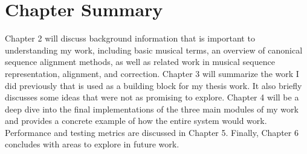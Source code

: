 \section{Chapter Summary}
Chapter 2 will discuss background information that is important to understanding my work, including basic musical terms, an overview of canonical sequence alignment methods, as well as related work in musical sequence representation, alignment, and correction. Chapter 3 will summarize the work I did previously that is used as a building block for my thesis work. It also briefly discusses some ideas that were not as promising to explore. Chapter 4 will be a deep dive into the final implementations of the three main modules of my work and provides a concrete example of how the entire system would work. Performance and testing metrics are discussed in Chapter 5. Finally, Chapter 6 concludes with areas to explore in future work. 

